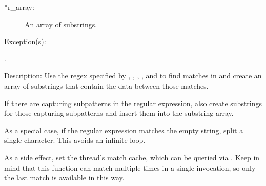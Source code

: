 \begin{capi}
\begin{capilist}
\begin{description}
		\item[*r\_array: ] An array of substrings.
		\end{description}
	\item[Exception(s): ]
		\begin{description}\item[]
		\item[.]
		\end{description}
	\item[Description: ]
		Use the regex specified by , ,
		, , and
		 to find matches in  and
		create an array of substrings that contain the data between
		those matches.

		If there are capturing subpatterns in the regular expression,
		also create substrings for those capturing subpatterns and
		insert them into the substring array.

		As a special case, if the regular expression matches the empty
		string, split a single character.  This avoids an infinite
		loop.

		As a side effect, set the thread's match cache, which can be
		queried via .  Keep in mind that
		this function can match multiple times in a single invocation,
		so only the last match is available in this way.


\end{capilist}
\end{capi}
